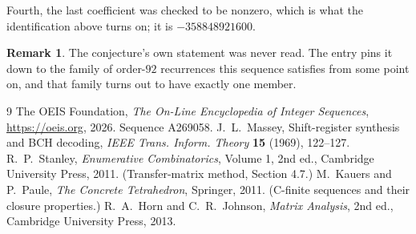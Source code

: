 \documentclass[11pt,a4paper]{article}
\theoremstyle{plain}
\theoremstyle{definition}
\newtheorem{remark}[theorem]{Remark}
\begin{document}
Fourth, the last coefficient was checked to be nonzero, which is what the identification above
turns on; it is $-358848921600$.

\begin{remark}
The conjecture's own statement was never read. The entry pins it down to the family of
order-$92$ recurrences this sequence satisfies from some point on, and that family turns
out to have exactly one member.
\end{remark}

\begin{thebibliography}{9}
 The OEIS Foundation, \emph{The On-Line Encyclopedia of Integer
Sequences}, \url{https://oeis.org}, 2026. Sequence A269058.
 J.~L.~Massey, Shift-register synthesis and BCH decoding, \emph{IEEE
Trans. Inform. Theory} \textbf{15} (1969), 122--127.
 R.~P.~Stanley, \emph{Enumerative Combinatorics}, Volume 1, 2nd ed.,
Cambridge University Press, 2011. (Transfer-matrix method, Section 4.7.)
 M.~Kauers and P.~Paule, \emph{The Concrete Tetrahedron}, Springer, 2011.
(C-finite sequences and their closure properties.)
 R.~A.~Horn and C.~R.~Johnson, \emph{Matrix Analysis}, 2nd ed., Cambridge
University Press, 2013.
\end{thebibliography}
\end{document}
